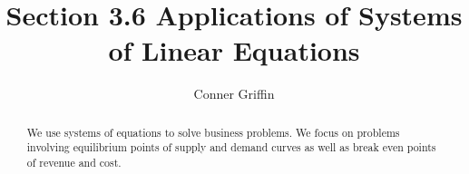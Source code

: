 \documentclass{ximera}
\title{Section 3.6 Applications of Systems of Linear Equations}
\author{Conner Griffin}
\begin{document}
\begin{abstract}
    We use systems of equations to solve business problems. We focus on problems involving equilibrium points of supply and demand curves as well as break even points of revenue and cost.
\end{abstract}
\maketitle





\end{document}
